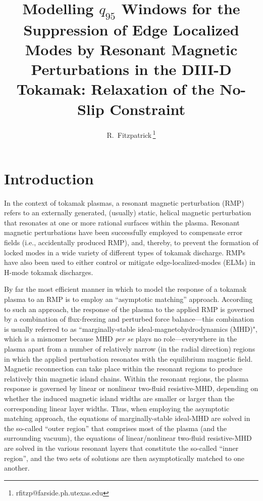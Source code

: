 \documentclass[12pt,prb,aps]{revtex4-1}
\begin{document}
\title {Modelling $q_{95}$ Windows for the Suppression of Edge Localized Modes by Resonant Magnetic Perturbations in the DIII-D Tokamak: Relaxation of the No-Slip
Constraint}

\author{R.~Fitzpatrick\,\footnote{rfitzp@farside.ph.utexas.edu}}


\section{Introduction}
In the context of tokamak plasmas, a resonant magnetic perturbation (RMP) refers to an externally
generated, (usually) static, helical magnetic perturbation that resonates at
one or more rational surfaces within the plasma. Resonant magnetic perturbations have been successfully
employed to compensate error fields (i.e., accidentally produced RMP), and, thereby,  to prevent the formation of
locked modes in a wide variety of different types of tokamak discharge. \cite{error1,error2,error3} RMPs have also been used to either control or
mitigate edge-localized-modes (ELMs) in H-mode tokamak discharges.\cite{elm1,elm2,elm3,elm4,elm5,elm6}

By far the most efficient manner in which to model the response of a tokamak plasma to an RMP is
to employ an ``asymptotic matching'' approach.\cite{fkr,rfa, am1,am2,am3} 
According to such an approach, the response of the plasma to the applied RMP is governed by a combination of flux-freezing and
perturbed force balance---this combination is usually referred to as ``marginally-stable ideal-magnetohydrodynamics (MHD)", which is a misnomer because MHD {\em per se}\/ plays no
role---everywhere in the plasma apart from a number of relatively narrow (in the radial direction) regions in which the applied
perturbation resonates with the equilibrium magnetic field. Magnetic reconnection can take place within the resonant regions to
produce relatively thin magnetic island chains. Within the resonant regions, the plasma response is governed by  linear or nonlinear 
 two-fluid resistive-MHD, depending on whether the induced magnetic island widths are smaller or larger than the corresponding linear layer widths. 
 Thus, when employing the asymptotic matching approach, the equations of marginally-stable ideal-MHD
are solved in the so-called ``outer region'' that comprises most of the plasma (and the surrounding vacuum), the equations of 
linear/nonlinear two-fluid resistive-MHD are solved in the various resonant layers that constitute the so-called ``inner region'', and the two
sets of solutions are then asymptotically matched to one another. 
\end{document}
